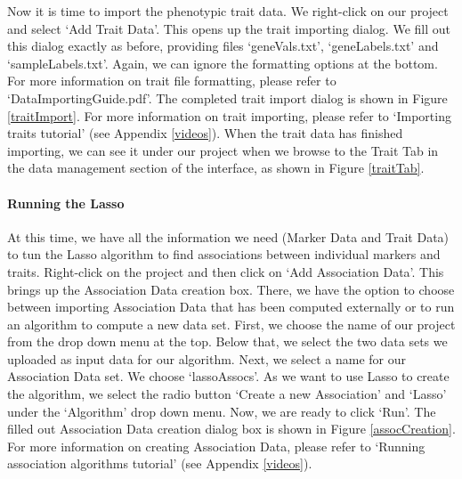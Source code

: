\documentclass{article}
\begin{document}
Now it is time to import the phenotypic trait data. We right-click on our project and select `Add Trait Data'. This opens up the trait importing dialog. We fill out this dialog exactly as before, providing files `geneVals.txt', `geneLabels.txt' and `sampleLabels.txt'. Again, we can ignore the formatting options at the bottom. For more information on trait file formatting, please refer to `DataImportingGuide.pdf'. The completed trait import dialog is shown in Figure \ref{traitImport}. For more information on trait importing, please refer to `Importing traits tutorial' (see Appendix \ref{videos}). When the trait data has finished importing, we can see it under our project when we browse to the Trait Tab in the data management section of the interface, as shown in Figure \ref{traitTab}. \\

\paragraph{Running the Lasso} At this time, we have all the information we need (Marker Data and Trait Data) to tun the Lasso algorithm to find associations between individual markers and traits. Right-click on the project and then click on `Add Association Data'. This brings up the Association Data creation box. There, we have the option to choose between importing Association Data that has been computed externally or to run an algorithm to compute a new data set. First, we choose the name of our project from the drop down menu at the top. Below that, we select the two data sets we uploaded as input data for our algorithm. Next, we select a name for our Association Data set. We choose `lassoAssocs'. As we want to use Lasso to create the algorithm, we select the radio button `Create a new Association' and `Lasso' under the `Algorithm' drop down menu. Now, we are ready to click `Run'. The filled out Association Data creation dialog box is shown in Figure \ref{assocCreation}. For more information on creating Association Data, please refer to `Running association algorithms tutorial' (see Appendix \ref{videos}). \\
\end{document}
